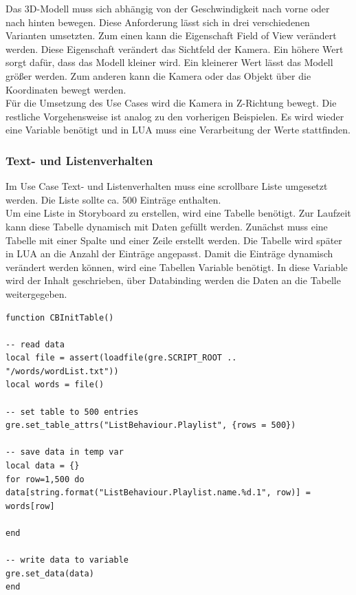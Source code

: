 \newpage

Das 3D-Modell muss sich abhängig von der Geschwindigkeit nach vorne oder nach hinten bewegen. Diese Anforderung lässt sich in drei verschiedenen Varianten umsetzten. Zum einen kann die Eigenschaft Field of View verändert werden. Diese Eigenschaft verändert das Sichtfeld der Kamera. Ein höhere Wert sorgt dafür, dass das Modell kleiner wird. Ein kleinerer Wert lässt das Modell größer werden. Zum anderen kann die Kamera oder das Objekt über die Koordinaten bewegt werden.\\

Für die Umsetzung des Use Cases wird die Kamera in Z-Richtung bewegt. Die restliche Vorgehensweise ist analog zu den vorherigen Beispielen. Es wird wieder eine Variable benötigt und in LUA muss eine Verarbeitung der Werte stattfinden.

\subsubsection{Text- und Listenverhalten}
Im Use Case Text- und Listenverhalten muss eine scrollbare Liste umgesetzt werden. Die Liste sollte ca. 500 Einträge enthalten.\\

Um eine Liste in Storyboard zu erstellen, wird eine Tabelle benötigt. Zur Laufzeit kann diese Tabelle dynamisch mit Daten gefüllt werden. Zunächst muss eine Tabelle mit einer Spalte und einer Zeile erstellt werden. Die Tabelle wird später in LUA an die Anzahl der Einträge angepasst. Damit die Einträge dynamisch verändert werden können, wird eine Tabellen Variable benötigt. In diese Variable wird der Inhalt geschrieben, über Databinding werden die Daten an die Tabelle weitergegeben.\\

\lstset{language=[5.0]Lua}
\begin{lstlisting}[frame=htrbl, caption={callbacks.lua}, label={lst:callbacks_story}]
function CBInitTable()

-- read data
local file = assert(loadfile(gre.SCRIPT_ROOT .. "/words/wordList.txt"))
local words = file()

-- set table to 500 entries
gre.set_table_attrs("ListBehaviour.Playlist", {rows = 500})

-- save data in temp var
local data = {}
for row=1,500 do
data[string.format("ListBehaviour.Playlist.name.%d.1", row)] = words[row]

end

-- write data to variable
gre.set_data(data)
end
\end{lstlisting}

